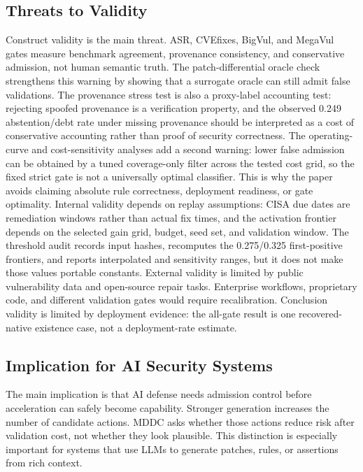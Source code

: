 ﻿\documentclass[lettersize,journal]{IEEEtran}
\begin{document}
\subsection{Threats to Validity}
Construct validity is the main threat. ASR, CVEfixes, BigVul, and MegaVul gates measure benchmark agreement, provenance consistency, and conservative admission, not human semantic truth. The patch-differential oracle check strengthens this warning by showing that a surrogate oracle can still admit false validations. The provenance stress test is also a proxy-label accounting test: rejecting spoofed provenance is a verification property, and the observed 0.249 abstention/debt rate under missing provenance should be interpreted as a cost of conservative accounting rather than proof of security correctness. The operating-curve and cost-sensitivity analyses add a second warning: lower false admission can be obtained by a tuned coverage-only filter across the tested cost grid, so the fixed strict gate is not a universally optimal classifier. This is why the paper avoids claiming absolute rule correctness, deployment readiness, or gate optimality. Internal validity depends on replay assumptions: CISA due dates are remediation windows rather than actual fix times, and the activation frontier depends on the selected gain grid, budget, seed set, and validation window. The threshold audit records input hashes, recomputes the 0.275/0.325 first-positive frontiers, and reports interpolated and sensitivity ranges, but it does not make those values portable constants. External validity is limited by public vulnerability data and open-source repair tasks. Enterprise workflows, proprietary code, and different validation gates would require recalibration. Conclusion validity is limited by deployment evidence: the all-gate result is one recovered-native existence case, not a deployment-rate estimate.

\subsection{Implication for AI Security Systems}
The main implication is that AI defense needs admission control before acceleration can safely become capability. Stronger generation increases the number of candidate actions. MDDC asks whether those actions reduce risk after validation cost, not whether they look plausible. This distinction is especially important for systems that use LLMs to generate patches, rules, or assertions from rich context.
\end{document}
